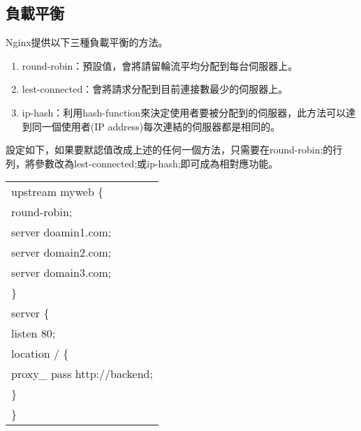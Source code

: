 \subsection{負載平衡}
\par
\renewcommand{\baselinestretch}{1} %
\twelve Nginx提供以下三種負載平衡的方法。
\begin{enumerate}
	\item round-robin：預設值，會將請留輪流平均分配到每台伺服器上。
	\item lest-connected：會將請求分配到目前連接數最少的伺服器上。
	\item ip-hash：利用hash-function來決定使用者要被分配到的伺服器，此方法可以達到同一個使用者(IP address)每次連結的伺服器都是相同的。
\\
\end{enumerate}
\par
\renewcommand{\baselinestretch}{1} %
\twelve 設定如下，如果要默認值改成上述的任何一個方法，只需要在round-robin;的行列，將參數改為lest-connected;或ip-hash;即可成為相對應功能。
\par
\begin{center}
\begin{tabular}{||p{15cm}|} %
\hline
upstream myweb \{
\\
\qquad round-robin;
\\
\qquad server doamin1.com;
\\
\qquad server domain2.com;
\\
\qquad server domain3.com;
\\
\}
\\
server \{
\\
\qquad listen 80;
\\
\qquad location / \{
\\
\qquad \quad proxy\_ pass \quad http://backend;
\\
\quad \}
\\
\}
\\
\hline
\end{tabular}
\end{center}
\par

\renewcommand{\baselinestretch}{20} %
